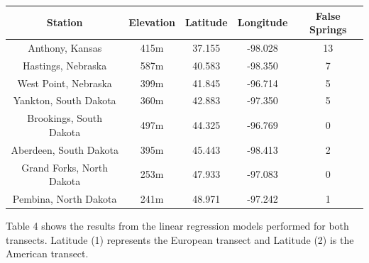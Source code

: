 \documentclass{article}\usepackage[]{graphicx}\usepackage[]{color}
\begin{document}
\begin{center}
 \label{tab:title2} 
\begin{tabular}{c c c c c}
\hline
Station & Elevation & Latitude & Longitude & False Springs \\
\hline
Anthony, Kansas & 415m & 37.155 & -98.028 & 13 \\
Hastings, Nebraska & 587m & 40.583 & -98.350  & 7 \\
West Point, Nebraska & 399m & 41.845 & -96.714 & 5 \\
Yankton, South Dakota & 360m & 42.883 & -97.350 & 5 \\
Brookings, South Dakota & 497m & 44.325 & -96.769 & 0 \\
Aberdeen, South Dakota & 395m & 45.443 & -98.413 & 2 \\
Grand Forks, North Dakota & 253m & 47.933 & -97.083 & 0 \\
Pembina, North Dakota & 241m & 48.971 & -97.242 & 1 \\
\hline
\end{tabular}
\end{center}

Table 4 shows the results from the linear regression models performed for both transects. Latitude (1) represents the European transect and Latitude (2) is the American transect. 
\end{document}
